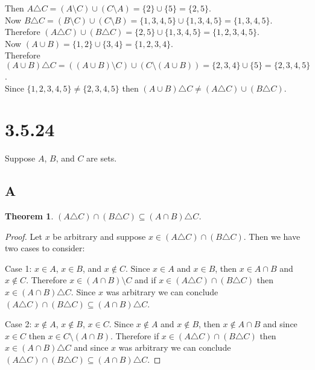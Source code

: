 \documentclass{article}
\newtheorem*{theorem}{Theorem}  %
\begin{document}
Then $A \triangle C = (A \setminus C) \cup (C \setminus A) = \{2\} \cup \{5\} = \{2, 5\}$. \\

Now $B \triangle C = (B \setminus C) \cup (C \setminus B) = \{1, 3, 4, 5\} \cup \{1, 3, 4, 5\} = \{1, 3, 4, 5\}$. \\

Therefore $(A \triangle C) \cup (B \triangle C) = \{2, 5\} \cup \{1, 3, 4, 5\} = \{1, 2, 3, 4, 5\}$. \\

Now $(A \cup B) = \{1, 2\} \cup \{3, 4\} = \{1, 2, 3, 4\}$. \\

Therefore $(A \cup B) \triangle C = ((A \cup B) \setminus C) \cup (C \setminus (A \cup B)) = \{2, 3, 4\} \cup \{5\} = \{2, 3, 4, 5\}$. \\

Since $\{1, 2, 3, 4, 5\} \neq \{2, 3, 4, 5\}$ then $( A \cup B ) \triangle C \neq (A \triangle C) \cup (B \triangle C)$.


\section*{3.5.24}
Suppose $A$, $B$, and $C$ are sets.

\subsection*{A} 

\begin{theorem} $( A \triangle C) \cap (B \triangle C) \subseteq (A \cap B) \triangle C$.
\end{theorem}

\begin{proof}
Let $x$ be arbitrary and suppose $x \in (A \triangle C) \cap (B \triangle C)$. Then we have two cases to consider:

Case 1: $x \in A$, $x \in B$, and $x \notin C$. Since $x \in A$ and $x \in B$, then $x \in A \cap B$ and $x \notin C$. Therefore $ x \in (A \cap B) \setminus C$ and if $x \in (A \triangle C) \cap (B \triangle C)$ then $x \in (A \cap B) \triangle C$. Since $x$ was arbitrary we can conclude $(A \triangle C) \cap (B \triangle C) \subseteq (A \cap B) \triangle C$. 

Case 2: $x \notin A$, $x \notin B$, $x \in C$. Since $x \notin A$ and $x \notin B$, then $x \notin A \cap B$ and since $x \in C$ then $x \in C \setminus (A \cap B)$. Therefore if $x \in (A \triangle C) \cap (B \triangle C)$ then $x \in (A \cap B) \triangle C$ and since $x$ was arbitrary we can conclude $(A \triangle C) \cap (B \triangle C) \subseteq (A \cap B) \triangle C$.
\end{proof}
\end{document}
